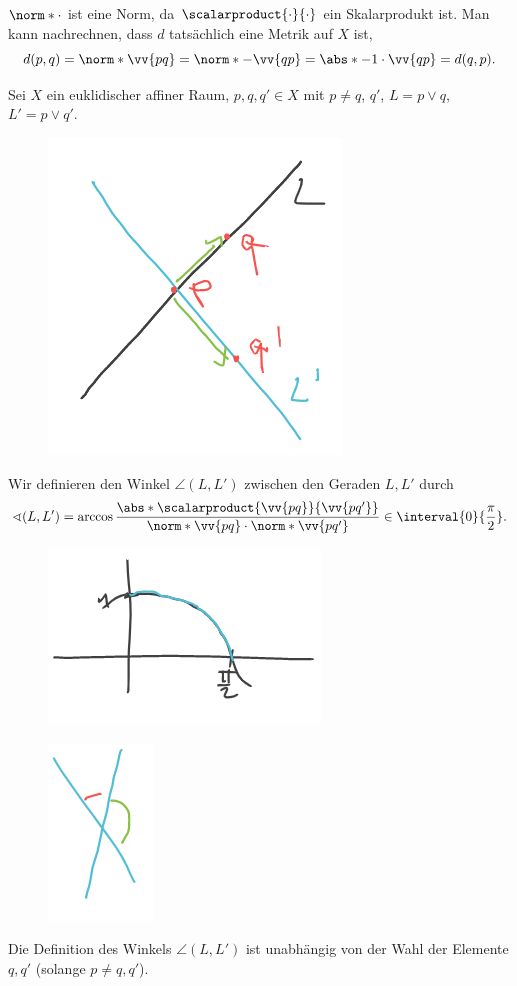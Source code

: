 \begin{bemerkung*}
  \( \norm*{\cdot} \) ist eine Norm, da \( \scalarproduct{\cdot}{\cdot} \) ein Skalarprodukt ist. Man kann nachrechnen, dass \( d \) tatsächlich eine Metrik auf \( X \) ist, \zb
  \begin{equation*}
    d(p,q)=\norm*{\vv{pq}}=\norm*{-\vv{qp}}=\abs*{-1}\cdot\vv{qp}=d(q,p).
  \end{equation*}
\end{bemerkung*}
\begin{definition*}
  Sei \( X \) ein euklidischer affiner Raum, \( p,q,q'\in X \) mit \( p\neq q \), \( q' \), \( L=p\vee q \), \( L'=p\vee q' \).
  \begin{figure}[H]
    \centering
    \includegraphics[width=0.5\linewidth]{figures/affiner_winkel_definition}
    \label{fig:affiner_winkel_definition}
  \end{figure}
  Wir definieren den Winkel \( \angle (L,L') \) zwischen den Geraden \( L,L' \) durch
  \begin{equation*}
    \angle (L,L')=\arccos \frac{\abs*{\scalarproduct{\vv{pq}}{\vv{pq'}}}}{\norm*{\vv{pq}}\cdot\norm*{\vv{pq'}}}\in \interval{0}{\frac{\pi}{2}}.
  \end{equation*}
  \begin{figure}[H]
    \centering
    \includegraphics[width=0.3\linewidth]{figures/affiner_winkel_definition_wertebereich}
    \label{fig:affiner_winkel_definition_wertebereich}
  \end{figure}
  \begin{figure}[H]
    \centering
    \includegraphics[width=0.1\linewidth]{figures/affiner_winkel_definition_wertebereich_beispiel}
    \label{fig:affiner_winkel_definition_wertebereich_beispiel}
  \end{figure}
\end{definition*}
\begin{bemerkung*}
  Die Definition des Winkels \( \angle (L,L') \) ist unabhängig von der Wahl der Elemente \( q,q' \) (solange \( p\neq q,q' \)).
\end{bemerkung*}